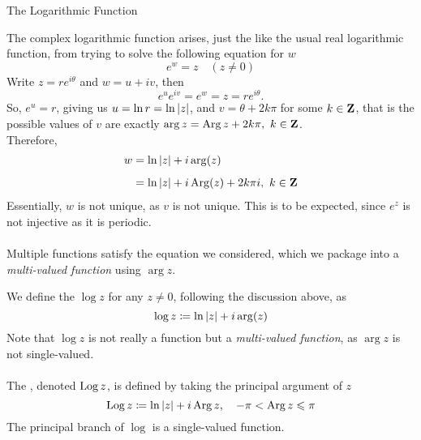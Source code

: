\vspace*{1em}

\begin{mdframed}
\begin{center}
{\Large The Logarithmic Function}
\end{center}
\end{mdframed}

\begin{discussion}
The complex logarithmic function arises, just the like the usual real logarithmic function, from trying to solve the following equation for $w$
\[e^w = z\quad (z \neq 0)\]
Write $z = re^{i\theta}$ and $w = u + iv$, then 
\[e^u e^{iv} = e^w = z = re^{i\theta}.\]
So, $e^u = r$, giving us $u = \ln r = \ln\left\lvert z\right\rvert$, and $v = \theta + 2k\pi$ for some $k \in \mathbf Z$, that is the possible values of $v$ are exactly $\arg z = \operatorname{Arg} z + 2k\pi,\ k \in \mathbf Z$.\\[0.5em]
Therefore, 
\begin{align*}
w &= \ln\left\lvert z\right\rvert + i\arg(z)\\[0.5em]
&= \ln\left\lvert z\right\rvert + i\operatorname{Arg}(z) + 2k\pi i,\ k \in \mathbf Z
\end{align*}
Essentially, $w$ is not unique, as $v$ is not unique. This is to be expected, since $e^z$ is not injective as it is periodic.\\
\\
Multiple functions satisfy the equation we considered, which we package into a \emph{multi-valued function} using $\arg z$.
\end{discussion}

\vspace*{1em}

\begin{definition}
We define the  $\log z$ for any $z \neq 0$, following the discussion above, as
\[\log z \coloneqq \ln\left\lvert z\right\rvert + i\arg(z)\]
Note that $\log z$ is not really a function but a \emph{multi-valued function}, as $\arg z$ is not single-valued.\\
\\
The , denoted $\operatorname{Log} z$, is defined by taking the principal argument of $z$
\[\operatorname{Log} z \coloneqq \ln\left\lvert z\right\rvert + i\operatorname{Arg} z,\quad -\pi < \operatorname{Arg} z \leqslant \pi\]
The principal branch of $\log$ is a single-valued function.
\end{definition}

\vspace*{1em}

